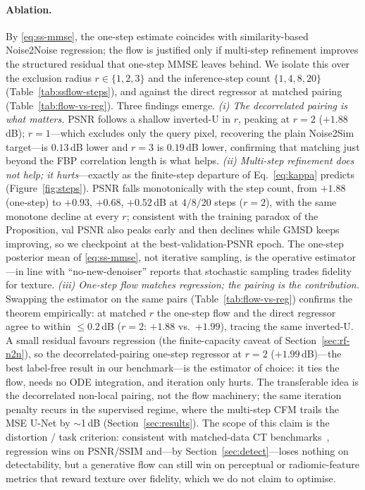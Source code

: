 \documentclass[letterpaper]{article} %
\begin{document}
\paragraph{Ablation.}
By \eqref{eq:ss-mmse}, the one-step estimate coincides with
similarity-based Noise2Noise regression; the flow is justified only if
multi-step refinement improves the structured residual that one-step
MMSE leaves behind.  We isolate this over the exclusion radius $r\in\{1,2,3\}$
and the inference-step count $\{1,4,8,20\}$ (Table~\ref{tab:ssflow-steps}), and
against the direct regressor at matched pairing (Table~\ref{tab:flow-vs-reg}).
Three findings emerge.
\emph{(i) The decorrelated pairing is what matters.}  PSNR follows a
shallow inverted-U in $r$, peaking at $r{=}2$ ($+1.88$\,dB); $r{=}1$---which
excludes only the query pixel, recovering the plain Noise2Sim target---is
$0.13$\,dB lower and $r{=}3$ is $0.19$\,dB lower, confirming that matching
just beyond the FBP correlation length is what helps.
\emph{(ii) Multi-step refinement does not help; it hurts}---exactly as the
finite-step departure of Eq.~\eqref{eq:kappa} predicts (Figure~\ref{fig:steps}).
PSNR falls monotonically with the step count, from $+1.88$ (one-step) to
$+0.93$, $+0.68$, $+0.52$\,dB at $4/8/20$ steps ($r{=}2$), with the same monotone
decline at every $r$; consistent with the training paradox of the Proposition, val PSNR
also peaks early and then declines while GMSD keeps improving, so we checkpoint at
the best-validation-PSNR epoch.  The one-step posterior mean of
\eqref{eq:ss-mmse}, not iterative sampling, is the operative estimator---in line
with ``no-new-denoiser'' reports that stochastic sampling trades fidelity for
texture.
\emph{(iii) One-step flow matches regression; the pairing is the contribution.}
Swapping the estimator on the same pairs (Table~\ref{tab:flow-vs-reg})
confirms the theorem empirically: at matched $r$ the one-step flow and the direct
regressor agree to within $\le0.2$\,dB ($r{=}2$: $+1.88$ vs.\ $+1.99$), tracing
the same inverted-U.  A small residual favours regression (the finite-capacity
caveat of Section~\ref{sec:rf-n2n}), so the decorrelated-pairing one-step
regressor at $r{=}2$ ($+1.99$\,dB)---the best label-free result in our
benchmark---is the estimator of choice: it ties the flow, needs no ODE
integration, and iteration only hurts.  The transferable idea is the decorrelated
non-local pairing, not the flow machinery; the same iteration penalty recurs in
the supervised regime, where the multi-step CFM trails the MSE U-Net by
$\sim$1\,dB (Section~\ref{sec:results}).  The scope of this claim is the
distortion / task criterion: consistent with matched-data CT
benchmarks~\cite{eulig2024benchmark}, regression wins on PSNR/SSIM and---by
Section~\ref{sec:detect}---loses nothing on detectability, but a generative flow
can still win on perceptual or radiomic-feature metrics that reward texture over
fidelity, which we do not claim to optimise.
\end{document}
